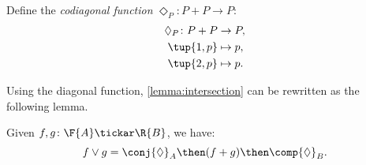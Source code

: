 \begin{definition}
Define the \emph{codiagonal function} $\Diamond_P\colon P+P \to P $:
\begin{equation}
\begin{aligned}
    \Diamond_P \colon P + P & \to P,  \\
            \tup{1,p} & \mapsto p, \\
            \tup{2,p} & \mapsto p.
\end{aligned}
\end{equation}
\end{definition}

\noindent Using the diagonal function, \cref{lemma:intersection} can be rewritten as the following lemma.

\begin{lemma}
    Given $f, g\colon \F{A} \tickar \R{B}$, we have:
    \begin{equation}
        f \vee g =  \conj{\Diamond}_A \then (f + g)\then \comp{\Diamond}_B.
    \end{equation}
\end{lemma}

